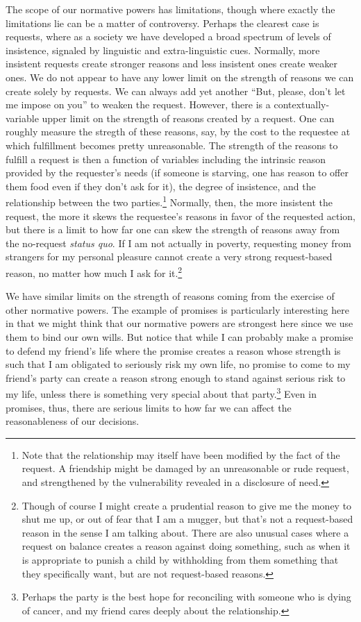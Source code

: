 The scope of our normative powers has limitations, though where exactly the limitations lie can be a matter of 
controversy. Perhaps the clearest case is requests, where as a society we have developed a broad spectrum of
levels of insistence, signaled by linguistic and extra-linguistic cues. Normally, 
more insistent requests create stronger reasons and less insistent ones create weaker ones. We do not appear
to have any lower limit on the strength of reasons we can create solely by requests. We can always add yet another
``But, please, don't let me impose on you'' to weaken the request. However, there is a contextually-variable
upper limit on the strength of reasons created by a request. One can roughly measure the stregth of these
reasons, say, by the cost to the requestee at which fulfillment becomes pretty unreasonable. The strength of
the reasons to fulfill a request is then a function of variables including the intrinsic reason provided by the requester's needs
(if someone is starving, one has reason to offer them food even if they don't ask for it), the degree of
insistence, and the relationship between the two parties.\footnote{Note that the relationship may itself have been modified
by the fact of the request. A friendship might be damaged by an unreasonable or rude request, and strengthened by 
the vulnerability revealed in a disclosure of need.} Normally, then, the more insistent the request, the more it skews
the requestee's reasons in favor of the requested action, but there is a limit to how far one can skew the strength of
reasons away from the no-request \textit{status quo}. If I am not actually in poverty, requesting money from strangers
for my personal pleasure cannot create a very strong request-based reason, no matter how much I ask for it.\footnote{Though
of course I might create a prudential reason to give me the money to shut me up, or out of fear that I am a mugger, but
that's not a request-based reason in the sense I am talking about. There are also unusual cases where a request on
balance creates a reason against doing something, such as when it is appropriate to punish a child by withholding
from them something that they specifically want, but are not request-based reasons.}

We have similar limits on the strength of reasons coming from the exercise of other normative powers. The example of
promises is particularly interesting here in that we might think that our normative powers are strongest here since 
we use them to bind our own wills. But notice that while I can probably make a promise to defend my friend's life 
where the promise creates a reason whose strength is such that I am obligated to seriously risk my own life, no
promise to come to my friend's party can create a reason strong enough to stand against serious risk to my life, unless
there is something very special about that party.\footnote{Perhaps the party is the best hope for reconciling with 
someone who is dying of cancer, and my friend cares deeply about the relationship.} Even in promises, thus, there are 
serious limits to how far we can affect the reasonableness of our decisions. 

